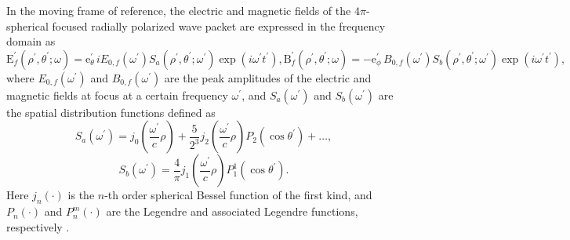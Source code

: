 \documentclass[10pt, a4paper, twoside, openright]{report}
\renewcommand{\vec}[1]{\boldsymbol{\mathrm{#1}}}
\begin{document}
In the moving frame of reference, the electric and magnetic fields of the $ 4 \pi $-spherical focused radially polarized wave packet are expressed in the frequency domain as \cite{Jeong2020, Jeong2021}
\begin{subequations}
\begin{equation}\label{eq:E_field_4pi}
\vec{E}^{\prime}_{f} \left( \rho^{\prime}, \theta^{\prime}; \omega \right) = \vec{e}_{\theta}^{\prime} \, i E_{0, f} \left( \omega^{\prime} \right) S_a \left( \rho^{\prime}, \theta^{\prime}; \omega^{\prime} \right) \exp \left(i \omega^{\prime} t^{\prime} \right),
\end{equation}
\begin{equation}\label{eq:B_field_4pi}
\vec{B}^{\prime}_{f} \left( \rho^{\prime}, \theta^{\prime}; \omega \right) = - \vec{e}_{\phi}^{\prime} \, B_{0, f} \left( \omega^{\prime} \right) S_b \left( \rho^{\prime}, \theta^{\prime}; \omega^{\prime} \right) \exp \left(i \omega^{\prime} t^{\prime} \right),
\end{equation}
\end{subequations}
where $ E_{0, f} \left( \omega^{\prime} \right) $ and $ B_{0, f} \left( \omega^{\prime} \right) $ are the peak amplitudes of the electric and magnetic fields at focus at a certain frequency $ \omega^{\prime} $, and $ S_a \left( \omega^{\prime} \right) $ and $ S_b \left( \omega^{\prime} \right) $ are the spatial distribution functions defined as \cite{Jeong2020, Jeong2021}
\begin{equation}\label{eq:S_a}
S_a \left( \omega^{\prime} \right) = j_0 \left( \frac{\omega^{\prime}}{c} \rho \right) + \frac{5}{2^3} j_2 \left( \frac{\omega^{\prime}}{c} \rho \right) P_2 \left( \cos \theta^{\prime} \right) + \dots,
\end{equation}
\begin{equation}\label{eq:S_b}
S_b \left( \omega^{\prime} \right) = \frac{4}{\pi} j_1 \left( \frac{\omega^{\prime}}{c} \rho \right) P^1_1 \left( \cos \theta^{\prime} \right).
\end{equation}
Here $ j_{n} \left( \cdot \right) $ is the $ n $-th order spherical Bessel function of the first kind, and $ P_n \left( \cdot \right) $ and $ P^m_n \left( \cdot \right) $ are the Legendre and associated Legendre functions, respectively \cite{Gradshteyn1965}.
\end{document}
